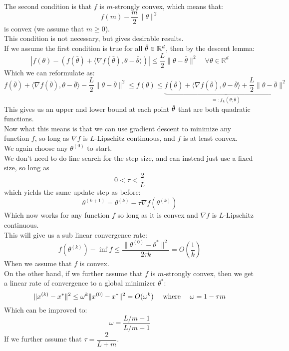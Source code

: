 \documentclass[12pt]{article}
\begin{document}
The second condition is that $f$
is $m$-strongly convex, which means that:
\[ f(m) - \dfrac{m}{2} \|\theta\|^2 \]
is convex (we assume that $m \geq 0$). \\
This condition is not necessary, but gives
desirable results. \\

If we assume the first condition
is true for all $\,\overline{\!{\theta}} \in \mathbb{R}^d$,
then by the descent lemma:
\[ \left| f(\theta) - \left( f(\bar{\theta}) 
+ \langle \nabla f(\bar{\theta}), \theta - 
\bar{\theta} \rangle \right) \right| 
\leq \frac{L}{2} \|\theta - \bar{\theta}\|^2 
\quad \forall \theta \in \mathbb{R}^d \]
Which we can reformulate as:
\[ f(\bar{\theta}) + \langle \nabla 
f(\bar{\theta}), \theta - \bar{\theta} 
\rangle - \frac{L}{2} \|\theta - 
\bar{\theta}\|^2 \leq f(\theta) \leq 
\underbrace{
f(\bar{\theta}) + \langle \nabla f(\bar{\theta}), 
\theta - \bar{\theta} \rangle + \frac{L}{2} 
\|\theta - \bar{\theta}\|^2}
_{=: f_L(\theta; \bar{\theta})}\]
This gives us an upper and lower bound at
each point $\,\overline{\!{\theta}}$ that are both
quadratic functions. \\

Now what this means is that we can use
gradient descent to minimize any function
$f$, so long as $\nabla f$
is $L$-Lipschitz continuous,
and $f$ is at least convex. \\
We again choose any $\theta^{(0)}$
to start. \\
We don't need to do line search for the step
size, and can instead just use a fixed
size, so long as
\[ 0 < \tau < \dfrac{2}{L}\]
which yields the same update step as before:
\[ \theta^{(k+1)} = \theta^{(k)} 
- \tau \nabla f(\theta^{(k)}) \]
Which now works for any function $f$
so long as it is convex and $\nabla f$
is $L$-Lipschitz continuous. \\

This will give us a sub linear convergence rate:
\[ f(\theta^{(k)}) - \inf f \leq 
\frac{\|\theta^{(0)} - \theta^*\|^2}{2 \tau k} 
= O\left(\frac{1}{k}\right) \]
When we assume that $f$ is convex. \\

On the other hand, if we further assume
that $f$ is $m$-strongly convex, then
we get a linear rate of convergence
to a global minimizer $\theta^*$:
\[ \|x^{(k)} - x^*\|^2 \leq \omega^k 
\|x^{(0)} - x^*\|^2 = O(\omega^k) 
\quad \text{ where } \quad \omega = 1 - \tau m \]
Which can be improved to:
\[ \omega = \frac{L/m - 1}{L/m + 1}\]
If we further assume that
$\tau = \dfrac{2}{L + m}$. \\
\end{document}
